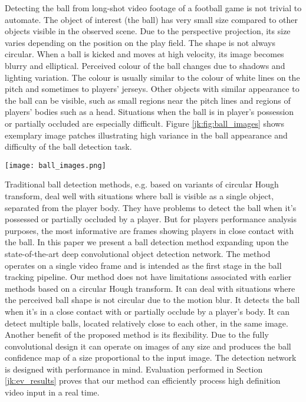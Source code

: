 \documentclass[a4paper,twoside]{article}
\begin{document}
Detecting the ball from long-shot video footage of a football game is not trivial to automate. The object of interest (the ball) has very small size compared to other objects visible in the observed scene. 
Due to the perspective projection, its size varies depending on the position on the play field. 
The shape is not always circular. When a ball is kicked and moves at high velocity, its image becomes blurry and elliptical.
Perceived colour of the ball changes due to shadows and lighting variation.
The colour is usually similar to the colour of white lines on the pitch and sometimes to players' jerseys.
Other objects with similar appearance to the ball can be visible, such as small regions near the pitch lines and regions of players' bodies such as a head. 
Situations when the ball is in player's possession or partially occluded are especially difficult.
Figure \ref{jk:fig:ball_images} shows exemplary image patches illustrating high variance in the ball appearance and difficulty of the ball detection task. 






\begin{figure*}
  \centering
  \texttt{[image: ball\_images.png]}
  \caption{Exemplary patches illustrating high variance in ball appearance and difficulty of the ball detection task.} \label{jk:fig:ball_images}
\end{figure*}

Traditional ball detection methods, e.g. based on variants of circular Hough transform, deal well with situations where ball is visible as a single object, separated from the player body. They have problems to detect the ball when it's possessed or partially occluded by a player. But for players performance analysis purposes, the most informative are frames showing players in close contact with the ball.
In this paper we present a ball detection method expanding upon the state-of-the-art deep convolutional object detection network. 
The method operates on a single video frame and is intended as the first stage in the ball tracking pipeline. 
Our method does not have limitations associated with earlier methods based on a circular Hough transform.  
It can deal with situations where the perceived ball shape is not circular due to the motion blur. It detects the ball when it's in a close contact with or partially occlude by a player's body. It can detect multiple balls, located relatively close to each other, in the same image.
Another benefit of the proposed method is its flexibility. Due to the fully convolutional design it can operate on images of any size and produces the ball confidence map of a size proportional to the input image.
The detection network is designed with performance in mind.
Evaluation performed in Section \ref{jk:ev_results} proves that our method can efficiently process high definition video input in a real time.
\end{document}
